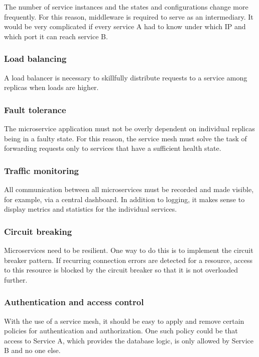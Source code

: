 The number of service instances and the states and configurations change more frequently. For this reason, middleware is required to serve as an intermediary. It would be very complicated if every service A had to know under which IP and which port it can reach service B.

\subsubsection{Load balancing}

A load balancer is necessary to skillfully distribute requests to a service among replicas when loads are higher.

\subsubsection{Fault tolerance}

The microservice application must not be overly dependent on individual replicas being in a faulty state. For this reason, the service mesh must solve the task of forwarding requests only to services that have a sufficient health state.

\subsubsection{Traffic monitoring}

All communication between all microservices must be recorded and made visible, for example, via a central dashboard. In addition to logging, it makes sense to display metrics and statistics for the individual services.

\subsubsection{Circuit breaking}
Microservices need to be resilient. One way to do this is to implement the circuit breaker pattern. If recurring connection errors are detected for a resource, access to this resource is blocked by the circuit breaker so that it is not overloaded further.

\subsubsection{Authentication and access control}

With the use of a service mesh, it should be easy to apply and remove certain policies for authentication and authorization. One such policy could be that access to Service A, which provides the database logic, is only allowed by Service B and no one else.

